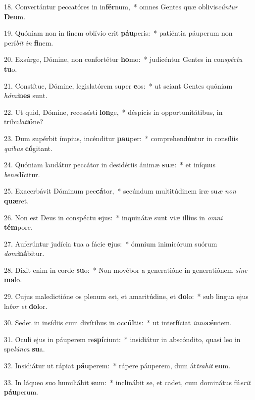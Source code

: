 18. Convertántur peccatóres in in\textbf{fér}num,~*  omnes Gentes quæ oblivis\textit{cún}\textit{tur} \textbf{De}um.\

19. Quóniam non in finem oblívio erit \textbf{páu}peris:~*  patiéntia páuperum non perí\textit{bit} \textit{in} \textbf{fi}nem.\

20. Exsúrge, Dómine, non confortétur \textbf{ho}mo:~*  judicéntur Gentes in con\textit{spéc}\textit{tu} \textbf{tu}o.\

21. Constítue, Dómine, legislatórem super \textbf{e}os:~*  ut sciant Gentes quóniam \textit{hó}\textit{mi}\textbf{nes} sunt.\

22. Ut quid, Dómine, recessísti \textbf{lon}ge,~*  déspicis in opportunitátibus, in tribu\textit{la}\textit{ti}\textbf{ó}ne?\

23. Dum supérbit ímpius, incénditur \textbf{pau}per:~*  comprehendúntur in consíliis \textit{qui}\textit{bus} \textbf{có}gitant.\

24. Quóniam laudátur peccátor in desidériis ánimæ \textbf{su}æ:~*  et iníquus \textit{be}\textit{ne}\textbf{dí}citur.\

25. Exacerbávit Dóminum pec\textbf{cá}tor,~*  secúndum multitúdinem iræ su\textit{æ} \textit{non} \textbf{quæ}ret.\

26. Non est Deus in conspéctu \textbf{e}jus:~*  inquinátæ sunt viæ illíus in \textit{om}\textit{ni} \textbf{tém}pore.\

27. Auferúntur judícia tua a fácie \textbf{e}jus:~*  ómnium inimicórum suórum \textit{do}\textit{mi}\textbf{ná}bitur.\

28. Dixit enim in corde \textbf{su}o:~*  Non movébor a generatióne in generatiónem \textit{si}\textit{ne} \textbf{ma}lo.\

29. Cujus maledictióne os plenum est, et amaritúdine, et \textbf{do}lo:~*  sub lingua ejus la\textit{bor} \textit{et} \textbf{do}lor.\

30. Sedet in insídiis cum divítibus in oc\textbf{cúl}tis:~*  ut interfíciat \textit{in}\textit{no}\textbf{cén}tem.\

31. Oculi ejus in páuperem re\textbf{spí}ciunt:~*  insidiátur in abscóndito, quasi leo in spe\textit{lún}\textit{ca} \textbf{su}a.\

32. Insidiátur ut rápiat \textbf{páu}perem:~*  rápere páuperem, dum át\textit{tra}\textit{hit} \textbf{e}um.\

33. In láqueo suo humiliábit \textbf{e}um:~*  inclinábit se, et cadet, cum dominátus fú\textit{e}\textit{rit} \textbf{páu}perum.\

